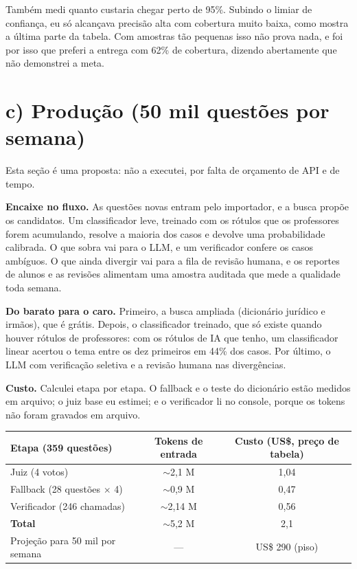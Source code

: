 \documentclass[11pt,a4paper]{article}
\newcommand{\bd}[1]{\textbf{#1}}
\begin{document}
Também medi quanto custaria chegar perto de 95\%. Subindo o limiar de confiança, eu só
alcançava precisão alta com cobertura muito baixa, como mostra a última parte da tabela. Com
amostras tão pequenas isso não prova nada, e foi por isso que preferi a entrega com 62\% de
cobertura, dizendo abertamente que não demonstrei a meta.

\section*{c) Produção (50 mil questões por semana)}

Esta seção é uma proposta: não a executei, por falta de orçamento de API e de tempo.

\bd{Encaixe no fluxo.} As questões novas entram pelo importador, e a busca propõe os
candidatos. Um classificador leve, treinado com os rótulos que os professores forem
acumulando, resolve a maioria dos casos e devolve uma probabilidade calibrada. O que sobra vai
para o LLM, e um verificador confere os casos ambíguos. O que ainda divergir vai para a fila
de revisão humana, e os reportes de alunos e as revisões alimentam uma amostra auditada que
mede a qualidade toda semana.

\bd{Do barato para o caro.} Primeiro, a busca ampliada (dicionário jurídico e irmãos), que é
grátis. Depois, o classificador treinado, que só existe quando houver rótulos de professores:
com os rótulos de IA que tenho, um classificador linear acertou o tema entre os dez primeiros
em 44\% dos casos. Por último, o LLM com verificação seletiva e a revisão humana nas
divergências.

\bd{Custo.} Calculei etapa por etapa. O fallback e o teste do dicionário estão medidos em
arquivo; o juiz base eu estimei; e o verificador li no console, porque os tokens não foram
gravados em arquivo.

\begin{center}
\begin{tabular}{lcc}
\toprule
\rowcolor{azul}\color{white}\bfseries Etapa (359 questões) & \color{white}\bfseries Tokens de entrada & \color{white}\bfseries Custo (US\$, preço de tabela) \\
\midrule
Juiz (4 votos) & $\sim$2,1 M & 1,04 \\
Fallback (28 questões $\times$ 4) & $\sim$0,9 M & 0,47 \\
Verificador (246 chamadas) & $\sim$2,14 M & 0,56 \\
\midrule
\rowcolor{cinzaforte}\bfseries Total & $\sim$5,2 M & 2,1 \\
Projeção para 50 mil por semana & --- & US\$ 290 (piso) \\
\bottomrule
\end{tabular}
\end{center}
\end{document}
